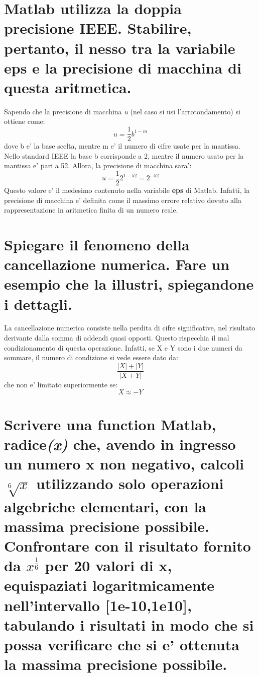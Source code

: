 \documentclass[10pt,a4paper]{article}
\begin{document}
\section{Matlab utilizza la doppia precisione IEEE. Stabilire, pertanto,
  il nesso tra la variabile eps e la precisione di macchina di questa aritmetica.}

Sapendo che la precisione di macchina \textit{u} (nel caso si usi l'arrotondamento) si ottiene come: \textit{\[u =\frac{1}{2}b^{1-m}\]}
dove b e' la base scelta, mentre m e' il numero di cifre usate per la mantissa. Nello standard IEEE la base b corrisponde a 2,
mentre il numero usato per la mantissa e' pari a 52. Allora, la precisione di macchina sara':  \textit{\[u =\frac{1}{2}2^{1-52}=2^{-52}\]}
Questo valore e' il medesimo contenuto nella variabile \textbf{eps} di Matlab.
Infatti, la precisione di macchina e' definita come il massimo errore relativo dovuto alla rappresentazione in aritmetica finita di un numero reale.

\section{Spiegare il fenomeno della cancellazione numerica. Fare un esempio che la illustri, spiegandone i dettagli.}

La cancellazione numerica consiste nella perdita di cifre
significative, nel risultato derivante dalla somma di addendi
quasi opposti. Questo rispecchia il mal condizionamento di
questa operazione. Infatti, se X e Y sono i due numeri da sommare,
il numero di condizione si vede essere dato da:
\[
  \frac{|X| + |Y|}{|X + Y|}
\] che non e' limitato superiormente se: $$ X \approx -Y $$

\section{Scrivere una function Matlab, radice\textit{(x)} che, avendo in ingresso un numero x non negativo,
calcoli $ \sqrt[6]{x} $ utilizzando solo operazioni algebriche elementari, con la massima precisione possibile.
Confrontare con il risultato fornito da $ x^{\frac{1}{6}} $ per 20 valori di x, equispaziati logaritmicamente nell'intervallo [1e-10,1e10],
tabulando i risultati in modo che si possa verificare che si e' ottenuta la massima precisione possibile.}
\end{document}
